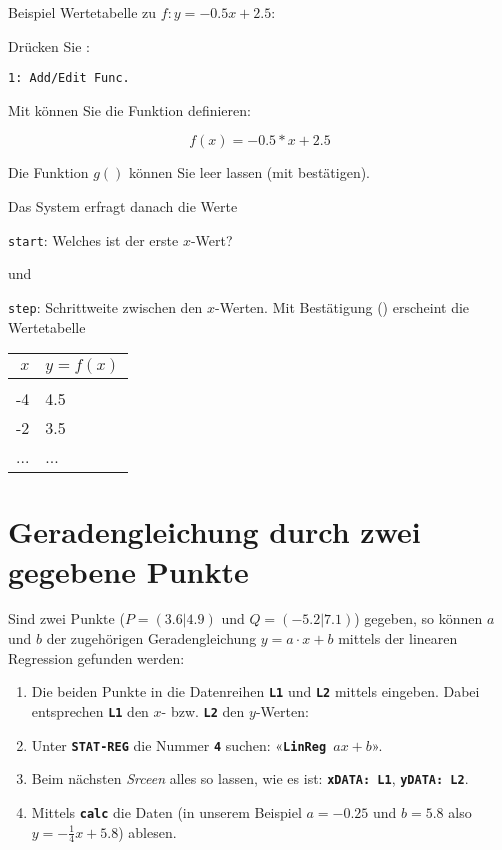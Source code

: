 Beispiel Wertetabelle zu $f: y=-0.5x + 2.5$:

Drücken Sie :

\texttt{1: Add/Edit Func.}

Mit  können Sie die Funktion definieren:

$$f(x) = -0.5 * x + 2.5$$

Die Funktion $g()$ können Sie leer lassen (mit 
bestätigen).

Das System erfragt danach die Werte

\texttt{start}: Welches ist der erste $x$-Wert?

und

\texttt{step}: Schrittweite zwischen den $x$-Werten. Mit Bestätigung
() erscheint die Wertetabelle

\begin{tabular}{r|l}
$x$ & $y=f(x)$\\
\hline\\
-4 & 4.5\\
-2 & 3.5\\
... &  ... \\
\end{tabular}
\newpage
\section{Geradengleichung durch zwei gegebene Punkte}\label{geradengleichung}
Sind zwei Punkte (\zB $P=(3.6 | 4.9)$ und $Q=(-5.2 | 7.1)$) gegeben,
so können $a$ und $b$ der zugehörigen Geradengleichung $y=a\cdot{}x+b$ mittels der
linearen Regression gefunden werden:

\begin{enumerate}
\item Die beiden Punkte in die Datenreihen \textbf{\texttt{L1}}
und \textbf{\texttt{L2}} mittels  eingeben. Dabei
entsprechen \textbf{\texttt{L1}} den $x$- bzw. \textbf{\texttt{L2}} den
$y$-Werten:

\item
Unter \textbf{\texttt{STAT-REG}}  
die Nummer \texttt{\textbf{4}} suchen:
«\texttt{\textbf{LinReg $ax+b$}}».

\item Beim nächsten \textit{Srceen} alles so lassen, wie es
ist: \texttt{\textbf{xDATA: L1}}, \textbf{\texttt{yDATA: L2}}.
\item Mittels \texttt{\textbf{calc}} die Daten (in unserem Beispiel
$a=-0.25$ und $b=5.8$ also $y=-\frac14x+5.8$) ablesen. 
\end{enumerate}



